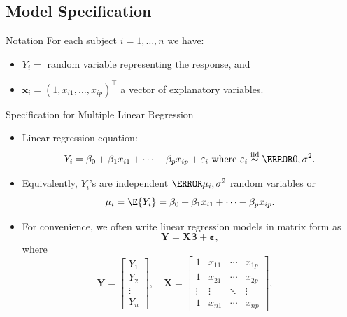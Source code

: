\documentclass{article}\usepackage[]{graphicx}\usepackage[svgnames]{xcolor}
\newcommand*\circled[1]{\tikz[baseline=(char.base)]{\node[shape=circle,draw,inner sep=2pt] (char) {#1};}}
\newcommand{\iid}{\overset{\text{iid}}{\sim}}%
\providecommand{\RandomVector}[1]{\bm{#1}}%
\providecommand{\Vector}[1]{\bm{#1}}%
\providecommand{\Matrix}[1]{\bm{#1}}
\begin{document}
\subsection*{\circled{1} Model Specification}
\begin{Regular}{Notation}
      For each subject $ i=1,\ldots,n $ we have:
      \begin{itemize}
            \item $ Y_i = $ random variable representing the response, and
            \item $ \Vector{x}_i =(1,x_{i1},\ldots,x_{ip})^\top $ a vector of explanatory variables.
      \end{itemize}
\end{Regular}
\begin{Regular}{Specification for Multiple Linear Regression}
      \begin{itemize}
            \item Linear regression equation:
                  \[ Y_i=\beta_0+\beta_1x_{i1}+\cdots+\beta_p x_{ip}+\varepsilon_i\text{ where }\varepsilon_i \iid\N{0,\sigma^2}. \]
            \item Equivalently, $Y_i$'s are independent $ \N{\mu_i,\sigma^2} $ random variables or
                  \[ \mu_i=\E{Y_i}=\beta_0+\beta_1x_{i1}+\cdots+\beta_p x_{ip}. \]
            \item For convenience, we often write linear regression models in matrix form as
                  \[ \RandomVector{Y}=\Matrix{X}\Vector{\beta}+\RandomVector{\varepsilon}, \]
                  where
                  \[ \RandomVector{Y}=\begin{bmatrix}
                              Y_1    \\
                              Y_2    \\
                              \vdots \\
                              Y_n
                        \end{bmatrix},\quad
                        \Matrix{X}=\begin{bmatrix}
                              1      & x_{11} & \cdots & x_{1p} \\
                              1      & x_{21} & \cdots & x_{2p} \\
                              \vdots & \vdots & \ddots & \vdots \\
                              1      & x_{n1} & \cdots & x_{np}
                        \end{bmatrix},\quad
\]
\end{itemize}
\end{Regular}
\end{document}
